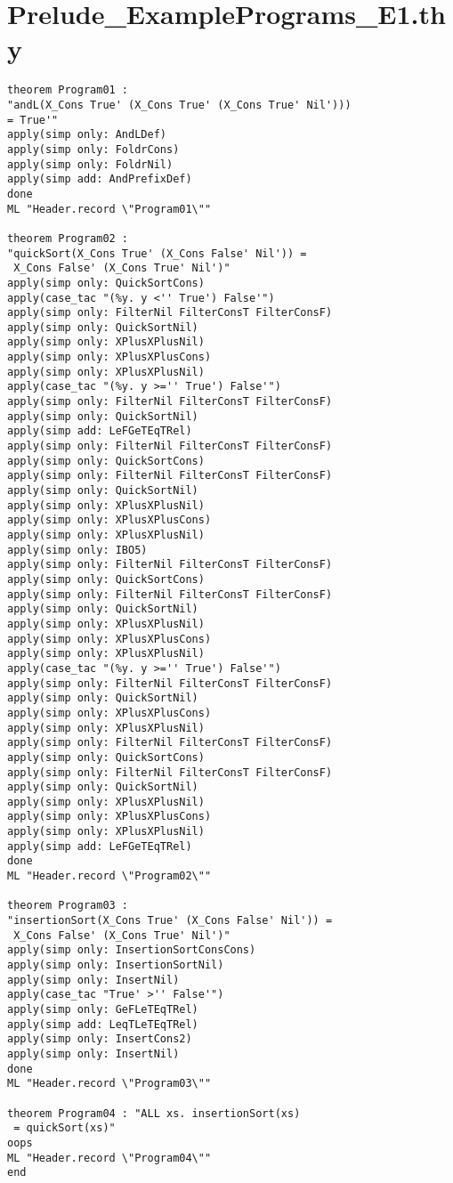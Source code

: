 \section{Prelude\_ExamplePrograms\_E1.thy}
\label{appendix:strictProofs:ExampleProgramsE1}
\begin{multicols}{2}
\tiny
\begin{Verbatim}
theorem Program01 :
"andL(X_Cons True' (X_Cons True' (X_Cons True' Nil'))) 
= True'"
apply(simp only: AndLDef)
apply(simp only: FoldrCons)
apply(simp only: FoldrNil)
apply(simp add: AndPrefixDef)
done
ML "Header.record \"Program01\""

theorem Program02 :
"quickSort(X_Cons True' (X_Cons False' Nil')) =
 X_Cons False' (X_Cons True' Nil')"
apply(simp only: QuickSortCons)
apply(case_tac "(%y. y <'' True') False'")
apply(simp only: FilterNil FilterConsT FilterConsF)
apply(simp only: QuickSortNil)
apply(simp only: XPlusXPlusNil)
apply(simp only: XPlusXPlusCons)
apply(simp only: XPlusXPlusNil)
apply(case_tac "(%y. y >='' True') False'")
apply(simp only: FilterNil FilterConsT FilterConsF)
apply(simp only: QuickSortNil)
apply(simp add: LeFGeTEqTRel)
apply(simp only: FilterNil FilterConsT FilterConsF)
apply(simp only: QuickSortCons)
apply(simp only: FilterNil FilterConsT FilterConsF)
apply(simp only: QuickSortNil)
apply(simp only: XPlusXPlusNil)
apply(simp only: XPlusXPlusCons)
apply(simp only: XPlusXPlusNil)
apply(simp only: IBO5)
apply(simp only: FilterNil FilterConsT FilterConsF)
apply(simp only: QuickSortCons)
apply(simp only: FilterNil FilterConsT FilterConsF)
apply(simp only: QuickSortNil)
apply(simp only: XPlusXPlusNil)
apply(simp only: XPlusXPlusCons)
apply(simp only: XPlusXPlusNil)
apply(case_tac "(%y. y >='' True') False'")
apply(simp only: FilterNil FilterConsT FilterConsF)
apply(simp only: QuickSortNil)
apply(simp only: XPlusXPlusCons)
apply(simp only: XPlusXPlusNil)
apply(simp only: FilterNil FilterConsT FilterConsF)
apply(simp only: QuickSortCons)
apply(simp only: FilterNil FilterConsT FilterConsF)
apply(simp only: QuickSortNil)
apply(simp only: XPlusXPlusNil)
apply(simp only: XPlusXPlusCons)
apply(simp only: XPlusXPlusNil)
apply(simp add: LeFGeTEqTRel)
done
ML "Header.record \"Program02\""

theorem Program03 :
"insertionSort(X_Cons True' (X_Cons False' Nil')) =
 X_Cons False' (X_Cons True' Nil')"
apply(simp only: InsertionSortConsCons)
apply(simp only: InsertionSortNil)
apply(simp only: InsertNil)
apply(case_tac "True' >'' False'")
apply(simp only: GeFLeTEqTRel)
apply(simp add: LeqTLeTEqTRel)
apply(simp only: InsertCons2)
apply(simp only: InsertNil)
done
ML "Header.record \"Program03\""

theorem Program04 : "ALL xs. insertionSort(xs)
 = quickSort(xs)"
oops
ML "Header.record \"Program04\""
end
\end{Verbatim}
\end{multicols}
